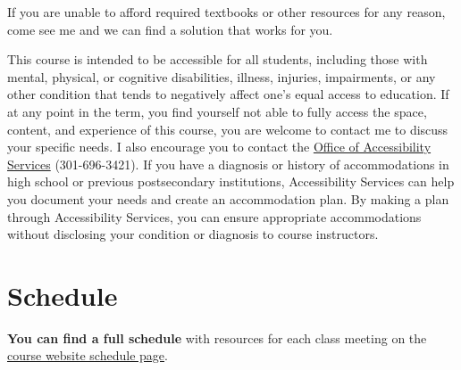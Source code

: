 \documentclass{article}
\begin{document}
If you are unable to afford required textbooks or other resources for
any reason, come see me and we can find a solution that works for you.

This course is intended to be accessible for all students, including
those with mental, physical, or cognitive disabilities, illness,
injuries, impairments, or any other condition that tends to negatively
affect one's equal access to education. If at any point in the term, you
find yourself not able to fully access the space, content, and
experience of this course, you are welcome to contact me to discuss your
specific needs. I also encourage you to contact the
\href{https://www.hood.edu/academics/josephine-steiner-center-academic-achievement-retention/accessibility-services}{Office
of Accessibility Services} (301-696-3421). If you have a diagnosis or
history of accommodations in high school or previous postsecondary
institutions, Accessibility Services can help you document your needs
and create an accommodation plan. By making a plan through Accessibility
Services, you can ensure appropriate accommodations without disclosing
your condition or diagnosis to course instructors.

\hypertarget{schedule}{%
\section{Schedule}\label{schedule}}

\textbf{You can find a full schedule} with resources for each class
meeting on the
\href{http://publics20.classes.ryansafner.com/schedule/}{course website
schedule page}.
\end{document}
